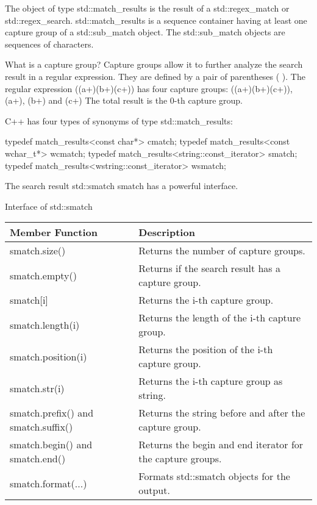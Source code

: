 

The object of type std::match\_results is the result of a std::regex\_match or std::regex\_search. std::match\_results is a sequence container having at least one capture group of a std::sub\_match object. The std::sub\_match objects are sequences of characters.

\begin{myNotic}{What is a capture group?}
Capture groups allow it to further analyze the search result in a regular expression. They are defined by a pair of parentheses ( ). The regular expression ((a+)(b+)(c+)) has four capture groups: ((a+)(b+)(c+)), (a+), (b+) and (c+) The total result is the 0-th capture group.
\end{myNotic}

C++ has four types of synonyms of type std::match\_results:

\begin{cpp}
typedef match_results<const char*> cmatch;
typedef match_results<const wchar_t*> wcmatch;
typedef match_results<string::const_iterator> smatch;
typedef match_results<wstring::const_iterator> wsmatch;
\end{cpp}

The search result std::smatch smatch has a powerful interface.

\begin{center}
Interface of std::smatch
\end{center}

\begin{longtable}[c]{|l|l|}
\hline
\textbf{Member Function}            & \textbf{Description}                                       \\ \hline
\endfirsthead
%
\endhead
%
smatch.size()                       & Returns the number of capture groups.                      \\ \hline
smatch.empty()                      & Returns if the search result has a capture group.          \\ \hline
smatch{[}i{]}                       & Returns the i-th capture group.                            \\ \hline
smatch.length(i)                    & Returns the length of the i-th capture group.              \\ \hline
smatch.position(i)                  & Returns the position of the i-th capture group.            \\ \hline
smatch.str(i)                       & Returns the i-th capture group as string.                  \\ \hline
smatch.prefix() and smatch.suffix() & Returns the string before and after the capture group.     \\ \hline
smatch.begin() and smatch.end()     & Returns the begin and end iterator for the capture groups. \\ \hline
smatch.format(...)                  & Formats std::smatch objects for the output.                \\ \hline
\end{longtable}

